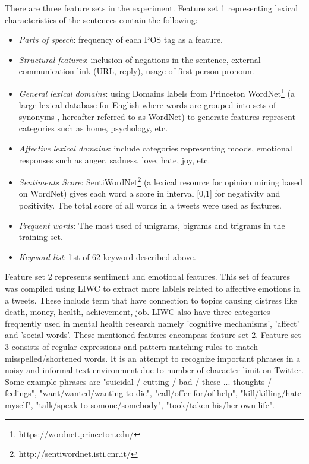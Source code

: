 There are three feature sets in the experiment. Feature set 1 representing lexical characteristics of the sentences contain the following:
\begin{itemize}
\item \textit{Parts of speech}: frequency of each POS tag as a feature.
\item\textit{ Structural features}: inclusion of negations in the sentence, external communication link (URL, reply), usage of first person pronoun.
\item \textit{General lexical domains}: using Domains labels from Princeton WordNet\textsuperscript{\textregistered}\footnote{https://wordnet.princeton.edu/} (a large lexical database for English where words are grouped into sets of synonyms \cite{Fellbaum1998}, hereafter referred to as WordNet) to generate features represent categories such as home, psychology, etc.
\item \textit{Affective lexical domains}: include categories representing moods, emotional responses such as anger, sadness, love, hate, joy, etc.
\item \textit{Sentiments Score}: SentiWordNet\footnote{http://sentiwordnet.isti.cnr.it/} (a lexical resource for opinion mining based on WordNet) gives each word a score in interval [0,1] for negativity and positivity. The total score of all words in a tweets were used as features.
\item \textit{Frequent words}: The most used of unigrams, bigrams and trigrams in the training set.
\item \textit{Keyword list}: list of 62 keyword described above. 
\end{itemize}
Feature set 2 represents sentiment and emotional features. This set of features was compiled using LIWC to extract more lablels related to affective emotions in a tweets. These include term that have connection to topics causing distress like death, money, health, achievement, job. LIWC also have three categories frequently used in mental health research namely 'cognitive mechanisms', 'affect' and 'social words'. These mentioned features encompass feature set 2. Feature set 3 consists of regular expressions and pattern matching rules to match misspelled/shortened words. It is an attempt to recognize important phrases in a noisy and informal text environment due to number of character limit on Twitter. Some example phrases are "suicidal / cutting / bad / these ... thoughts / feelings", "want/wanted/wanting to die", "call/offer for/of help", "kill/killing/hate myself", "talk/speak to somone/somebody", "took/taken his/her own life". 
